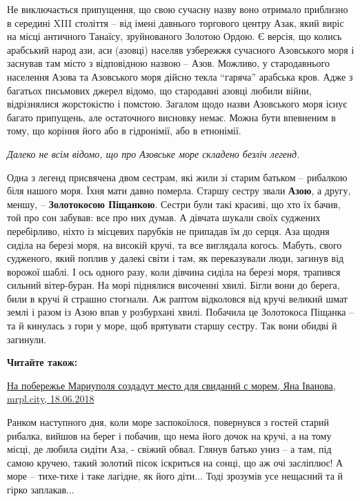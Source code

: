 Не виключається припущення, що свою сучасну назву воно отримало приблизно в
середині XIII століття – від імені давнього торгового центру Азак, який виріс
на місці античного Танаїсу, зруйнованого Золотою Ордою. Є версія, що колись
арабський народ ази, аси (азовці) населяв узбережжя сучасного Азовського моря і
заснував там місто з відповідною назвою – Азов. Можливо, у стародавнього
населення Азова та Азовського моря дійсно текла \enquote{гаряча} арабська кров. Адже з
багатьох письмових джерел відомо, що стародавні азовці любили війни,
відрізнялися жорстокістю і помстою. Загалом щодо назви Азовського моря існує
багато припущень, але остаточного висновку немає. Можна бути впевненим в тому,
що коріння його або в гідронімії, або в етнонімії.


\emph{Далеко не всім відомо, що про Азовське море складено безліч легенд.}

Одна з легенд присвячена двом сестрам, які жили зі старим батьком – рибалкою
біля нашого моря. Їхня мати давно померла. Старшу сестру звали \textbf{Азою}, а другу,
меншу, – \textbf{Золотокосою Піщанкою}. Сестри були такі красиві, що хто їх бачив, той
про сон забував: все про них думав. А дівчата шукали своїх суджених
перебірливо, ніхто із місцевих парубків не припадав їм до серця. Аза щодня
сиділа на березі моря, на високій кручі, та все виглядала когось. Мабуть, свого
судженого, який поплив у далекі світи і там, як переказували люди, загинув від
ворожої шаблі. І ось одного разу, коли дівчина сиділа на березі моря, трапився
сильний вітер-буран. На морі піднялися височенні хвилі. Бігли вони до берега,
били в кручі й страшно стогнали. Аж раптом відколовся від кручі великий шмат
землі і разом із Азою впав у розбурхані хвилі. Побачила це Золотокоса Піщанка –
та й кинулась з гори у море, щоб врятувати старшу сестру. Так вони обидві й
загинули. 

\textbf{Читайте також:} 

\href{https://mrpl.city/news/view/na-poberezhe-mariupolya-sozdadut-mesto-dlya-svidanij-s-morem}{%
На побережье Мариуполя создадут место для свиданий с морем, Яна Іванова, mrpl.city, 18.06.2018}

Ранком наступного дня, коли море заспокоїлося, повернувся з гостей старий
рибалка, вийшов на берег і побачив, що нема його дочок на кручі, а на тому
місці, де любила сидіти Аза, - свіжий обвал. Глянув батько униз – а там, під
самою кручею, такий золотий пісок іскриться на сонці, що аж очі засліплює! А
море – тихе-тихе і таке лагідне, як його діти... Тоді зрозумів усе нещасний та
й гірко заплакав...

